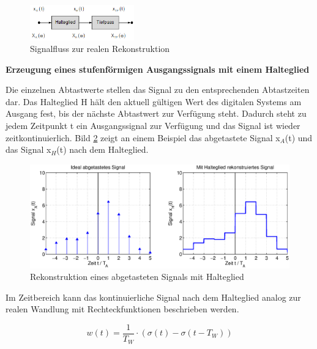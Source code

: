 \clearpage
\begin{figure}[H]
  \centerline{\includegraphics[width=0.4\textwidth]{Kapitel1/Bilder/image15}}
  \caption{Signalfluss zur realen Rekonstruktion}
  \label{fig:SignalflussRekonstruktion}
\end{figure}


{\selectfont
\noindent\textbf{Erzeugung eines stufenförmigen Ausgangssignals mit einem Halteglied}} \smallskip

\noindent Die einzelnen Abtastwerte stellen das Signal zu den entsprechenden Abtastzeiten dar. Das Halteglied H h\"{a}lt den aktuell g\"{u}ltigen Wert des digitalen Systems am Ausgang fest, bis der n\"{a}chste Abtastwert zur Verf\"{u}gung steht. Dadurch steht zu jedem Zeitpunkt t ein Ausgangssignal zur Verf\"{u}gung und das Signal ist wieder zeitkontinuierlich. Bild \ref{fig:RekonstruktionRealSignal} zeigt an einem Beispiel das abgetastete Signal x${}_{A}$(t) und das Signal x${}_{H}$(t) nach dem Halteglied.

\begin{figure}[H]
  \centerline{\includegraphics[width=1\textwidth]{Kapitel1/Bilder/image16}}
  \caption{Rekonstruktion eines abgetasteten Signals mit Halteglied}
  \label{fig:RekonstruktionRealSignal}
\end{figure}

\noindent Im Zeitbereich kann das kontinuierliche Signal nach dem Halteglied analog zur realen Wandlung mit Rechteckfunktionen beschrieben werden.

\begin{equation}\label{eq:twotwentyseven}
w\left(t\right)=\frac{1}{T_{W} } \cdot \left(\sigma \left(t\right)-\sigma \left(t-T_{W} \right)\right)
\end{equation}

